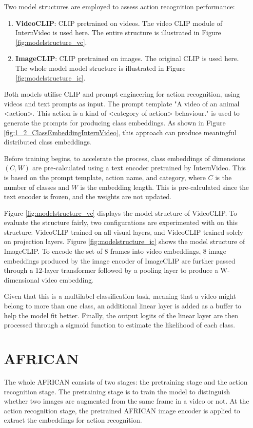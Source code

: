 Two model structures are employed to assess action recognition performance: 
\begin{enumerate}
    \item \textbf{VideoCLIP}: CLIP pretrained on videos. The video CLIP module of InternVideo \parencite{wang2022internvideo} is used here. The entire structure is illustrated in Figure \ref{fig:modelstructure_vc}.
    \item \textbf{ImageCLIP}: CLIP pretrained on images. The original CLIP \parencite{radford2021learning} is used here. The whole model model structure is illustrated in Figure \ref{fig:modelstructure_ic}.
\end{enumerate}

Both models utilise CLIP and prompt engineering for action recognition, using videos and text prompts as input. The prompt template "A video of an animal <action>. This action is a kind of <category of action> behaviour." is used to generate the prompts for producing class embeddings. As shown in Figure \ref{fig:1_2_ClassEmbeddingInternVideo}, this approach can produce meaningful distributed class embeddings.

Before training begins, to accelerate the process, class embeddings of dimensions $(C, W)$ are pre-calculated using a text encoder pretrained by InternVideo. This is based on the prompt template, action name, and category, where $C$ is the number of classes and $W$ is the embedding length. This is pre-calculated since the text encoder is frozen, and the weights are not updated. 

Figure \ref{fig:modelstructure_vc} displays the model structure of VideoCLIP. To evaluate the structure fairly, two configurations are experimented with on this structure: VideoCLIP trained on all visual layers, and VideoCLIP trained solely on projection layers. Figure \ref{fig:modelstructure_ic} shows the model structure of ImageCLIP. To encode the set of 8 frames into video embeddings, 8 image embeddings produced by the image encoder of ImageCLIP are further passed through a 12-layer transformer followed by a pooling layer to produce a W-dimensional video embedding.

Given that this is a multilabel classification task, meaning that a video might belong to more than one class, an additional linear layer is added as a buffer to help the model fit better. Finally, the output logits of the linear layer are then processed through a sigmoid function to estimate the likelihood of each class.

\section{AFRICAN}
The whole AFRICAN consists of two stages: the pretraining stage and the action recognition stage. The pretraining stage is to train the model to distinguish whether two images are augmented from the same frame in a video or not. At the action recognition stage, the pretrained AFRICAN image encoder is applied to extract the embeddings for action recognition. 

